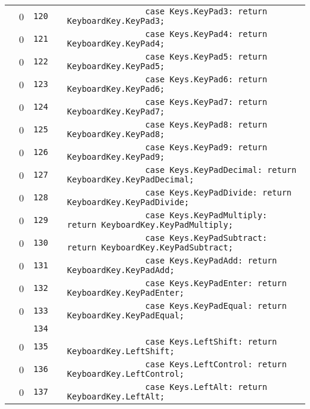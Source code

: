 \documentclass[a4paper,landscape,10pt]{article}
\begin{document}
\begin{longtable}[l]{lrrll}
\cellcolor{red} & 0 & \verb~120~ & & \verb~                case Keys.KeyPad3: return KeyboardKey.KeyPad3;~\\
\cellcolor{red} & 0 & \verb~121~ & & \verb~                case Keys.KeyPad4: return KeyboardKey.KeyPad4;~\\
\cellcolor{red} & 0 & \verb~122~ & & \verb~                case Keys.KeyPad5: return KeyboardKey.KeyPad5;~\\
\cellcolor{red} & 0 & \verb~123~ & & \verb~                case Keys.KeyPad6: return KeyboardKey.KeyPad6;~\\
\cellcolor{red} & 0 & \verb~124~ & & \verb~                case Keys.KeyPad7: return KeyboardKey.KeyPad7;~\\
\cellcolor{red} & 0 & \verb~125~ & & \verb~                case Keys.KeyPad8: return KeyboardKey.KeyPad8;~\\
\cellcolor{red} & 0 & \verb~126~ & & \verb~                case Keys.KeyPad9: return KeyboardKey.KeyPad9;~\\
\cellcolor{red} & 0 & \verb~127~ & & \verb~                case Keys.KeyPadDecimal: return KeyboardKey.KeyPadDecimal;~\\
\cellcolor{red} & 0 & \verb~128~ & & \verb~                case Keys.KeyPadDivide: return KeyboardKey.KeyPadDivide;~\\
\cellcolor{red} & 0 & \verb~129~ & & \verb~                case Keys.KeyPadMultiply: return KeyboardKey.KeyPadMultiply;~\\
\cellcolor{red} & 0 & \verb~130~ & & \verb~                case Keys.KeyPadSubtract: return KeyboardKey.KeyPadSubtract;~\\
\cellcolor{red} & 0 & \verb~131~ & & \verb~                case Keys.KeyPadAdd: return KeyboardKey.KeyPadAdd;~\\
\cellcolor{red} & 0 & \verb~132~ & & \verb~                case Keys.KeyPadEnter: return KeyboardKey.KeyPadEnter;~\\
\cellcolor{red} & 0 & \verb~133~ & & \verb~                case Keys.KeyPadEqual: return KeyboardKey.KeyPadEqual;~\\
\cellcolor{gray} &  & \verb~134~ & & \verb~~\\
\cellcolor{red} & 0 & \verb~135~ & & \verb~                case Keys.LeftShift: return KeyboardKey.LeftShift;~\\
\cellcolor{red} & 0 & \verb~136~ & & \verb~                case Keys.LeftControl: return KeyboardKey.LeftControl;~\\
\cellcolor{red} & 0 & \verb~137~ & & \verb~                case Keys.LeftAlt: return KeyboardKey.LeftAlt;~\\

\end{longtable}
\end{document}
